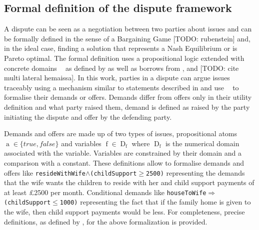 \documentclass[12pt,msc,a4paper,oneside]{ucl_thesis}
\DeclareMathOperator{\Proplang}{\mathcal{L}(N)}
\DeclareMathOperator{\propatom}{a}
\DeclareMathOperator{\propvar}{f}
\DeclareMathOperator{\Propdom}{D}
\begin{document}
\subsection{Formal definition of the dispute framework}
A dispute can be seen as a negotiation between two parties about issues and can be formally defined in the sense of a Bargaining Game \cite{Nash:bargaining} [TODO: rubenstein] and, in the ideal case, finding a solution that represents a Nash Equilibrium or is Pareto optimal. The formal definition uses a propositional logic extended with concrete domains $\Proplang$ as defined by \cite{Ragone2008} as well as borrows from  \cite{DBLP:journals:corr:ZhangZ14a}, \cite{Bellucci:2004:IAI:1032651.1033678} and [TODO: cite multi lateral hemaissa].
In this work, parties in a dispute can argue issues traceably using a mechanism similar to statements described in \cite{Bellucci:2004:IAI:1032651.1033678} and use $\Proplang$ to formalise their demands or offers. Demands differ from offers only in their utility definition and what party raised them, demand is defined as raised by the party initiating the dispute and offer by the defending party.

Demands and offers are made up of two types of issues, propositional atoms $\propatom \in \{true, false\}$ and variables $\propvar \in \Propdom_{\propvar}$ where $\Propdom_{\propvar}$ is the numerical domain associated with the variable. Variables are constrained by their domain and a comparison with a constant. These definitions allow to formalise demands and offers like \texttt{resideWithWife$\wedge$(childSupport$\geq$2500)} representing the demands that the wife wants the children to reside with her and child support payments of at least £2500 per month. Conditional demands like \texttt{houseToWife$\Rightarrow$(childSupport$\leq$1000)} representing the fact that if the family home is given to the wife, then child support payments would be less. For completeness, precise definitions, as defined by \cite{Ragone2008} \cite{Baader:1991:SIC:1631171.1631239}, for the above formalization is provided.
\end{document}
